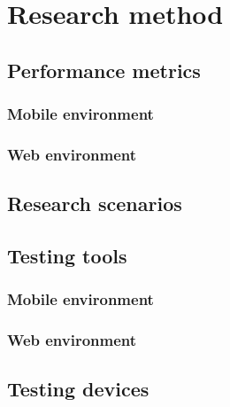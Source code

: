 
\chapter{Research method}

\section{Performance metrics}

\subsection{Mobile environment}

\subsection{Web environment}

\section{Research scenarios}

\section{Testing tools}

\subsection{Mobile environment}

\subsection{Web environment}

\section{Testing devices}